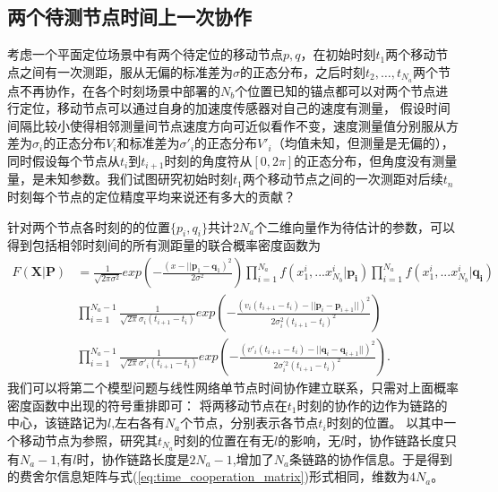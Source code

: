\subsection{两个待测节点时间上一次协作}

考虑一个平面定位场景中有两个待定位的移动节点$p,q$，在初始时刻$t_1$两个移动节点之间有一次测距，服从无偏的标准差为$\sigma$的正态分布，之后时刻$t_2,\dots,t_{N_a}$两个节点不再协作，在各个时刻场景中部署的$N_b$个位置已知的锚点都可以对两个节点进行定位，移动节点可以通过自身的加速度传感器对自己的速度有测量，
假设时间间隔比较小使得相邻测量间节点速度方向可近似看作不变，速度测量值分别服从方差为$\sigma_i$的正态分布$V_i$和标准差为$\sigma'_i$的正态分布$V'_i$（均值未知，但测量是无偏的），同时假设每个节点从$t_i$到$t_{i+1}$时刻的角度符从$[0,2\pi]$的正态分布，但角度没有测量量，是未知参数。我们试图研究初始时刻$t_1$两个移动节点之间的一次测距对后续$t_n$时刻每个节点的定位精度平均来说还有多大的贡献？

针对两个节点各时刻的的位置$\{p_i,q_i\}$共计$2N_a$个二维向量作为待估计的参数，可以得到包括相邻时刻间的所有测距量的联合概率密度函数为
\begin{equation}
\begin{split}
F(\bm{X}|\bm{P})&=\frac{1}{\sqrt{2\pi\sigma^2}}exp\left(-\frac{(x-||\bm{p}_1-\bm{q}_1)^2}{2\sigma^2}\right)\prod_{i=1}^{N_a}
f(x^i_1,...x^{i}_{N_b}|\bm{p_i})
\prod_{i=1}^{N_a} f(x^i_1,...x^{i}_{N_b}|\bm{q_i})\\
&\prod_{i=1}^{N_a-1}\frac{1}{\sqrt{2\pi}\sigma_i(t_{i+1}-t_i)}
exp\left(-\frac{(v_i(t_{i+1}-t_i)-||\bm{p}_i-\bm{p}_{i+1}||)^2}{2\sigma_i^2(t_{i+1}-t_i)^2}\right)\\
&\prod_{i=1}^{N_a-1}\frac{1}{\sqrt{2\pi}\sigma'_i(t_{i+1}-t_i)}
exp\left(-\frac{(v'_i(t_{i+1}-t_i)-||\bm{q}_i-\bm{q}_{i+1}||)^2}{2\sigma^{'2}_i(t_{i+1}-t_i)^2}\right).
\end{split}
\end{equation}
我们可以将第二个模型问题与线性网络单节点时间协作建立联系，只需对上面概率密度函数中出现的符号重排即可：
将两移动节点在$t_1$时刻的协作的边作为链路的中心，该链路记为$l$,左右各有$N_a$个节点，分别表示各节点$t_i$时刻的位置。
以其中一个移动节点为参照，研究其$t_{N_a}$时刻的位置在有无$l$的影响，无$l$时，协作链路长度只有$N_a-1$,有$l$时，协作链路长度是$2N_a-1$,增加了$N_a$条链路的协作信息。于是得到的费舍尔信息矩阵与式(\ref{eq:time_cooperation_matrix})形式相同，维数为$4N_a$。

